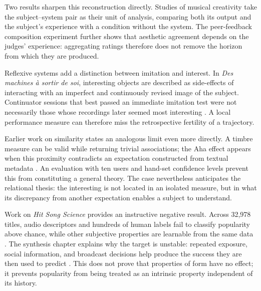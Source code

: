 \documentclass[11pt,a4paper]{article}
\begin{document}
Two results sharpen this reconstruction directly. Studies of musical creativity
take the subject--system pair as their unit of analysis, comparing both its output
and the subject's experience with a condition without the system. The peer-feedback
composition experiment further shows that aesthetic agreement depends on the judges'
experience: aggregating ratings therefore does not remove the horizon from which they
are produced.

Reflexive systems add a distinction between imitation and interest. In
\emph{Des machines à sortir de soi}, interesting objects are described as
side-effects of interacting with an imperfect and continuously revised image of
the subject. Continuator sessions that best passed an immediate imitation test
were not necessarily those whose recordings later seemed most interesting
\parencite{pachet2008machines}. A local performance measure can therefore miss
the retrospective fertility of a trajectory.

Earlier work on similarity states an analogous limit even more directly. A
timbre measure can be valid while returning trivial associations; the Aha effect
appears when this proximity contradicts an expectation constructed from textual
metadata \parencite{aucouturier2002similarity}. An evaluation with ten users and
hand-set confidence levels prevent this from constituting a general theory. The
case nevertheless anticipates the relational thesis: the interesting is not
located in an isolated measure, but in what its discrepancy from another
expectation enables a subject to understand.

Work on \emph{Hit Song Science} provides an instructive negative result. Across
32,978 titles, audio descriptors and hundreds of human labels fail to classify
popularity above chance, while other subjective properties are learnable from
the same data \parencite{pachetroy2008hitsong}. The synthesis chapter explains
why the target is unstable: repeated exposure, social information, and broadcast
decisions help produce the success they are then used to predict
\parencite{pachet2011hitsong}. This does not prove that properties of form have
no effect; it prevents popularity from being treated as an intrinsic property
independent of its history.
\end{document}

